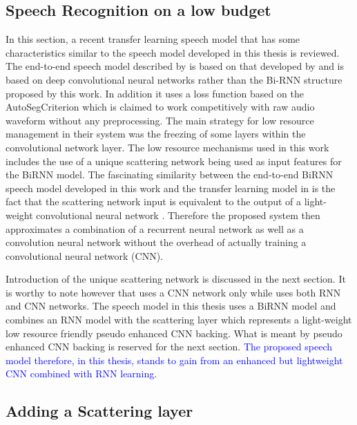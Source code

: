 \subsection{Speech Recognition on a low budget}

In this section, a recent transfer learning speech model \citep{kunze2017transfer} that has some characteristics similar to the speech model developed in this thesis is reviewed.  The end-to-end speech model described by \cite{kunze2017transfer} is based on that developed by \cite{collobert2016wav2letter} and is based on deep convolutional neural networks rather than the Bi-RNN structure proposed by this work.  In addition it uses a loss function based on the AutoSegCriterion which is claimed to work competitively with raw audio waveform without any preprocessing.  The main strategy for low resource management in their system was the freezing of some layers within the convolutional network layer.  The low resource mechanisms used in this work includes the use of a unique scattering network being used as input features for the BiRNN model.  The fascinating similarity between the end-to-end BiRNN speech model developed in this work and the transfer learning model in \cite{kunze2017transfer} is the fact that the scattering network input is equivalent to the output of a light-weight convolutional neural network \cite{mallat2016understanding}.  Therefore the proposed system then approximates a combination of a recurrent neural network as well as a convolution neural network without the overhead of actually training a convolutional neural network (CNN)\citep{szegedy2015going}.

Introduction of the unique scattering network is discussed in the next section.  It is worthy to note however that \cite{kunze2017transfer} uses a CNN network only while \cite{amodei2016deep} uses both RNN and CNN networks.  The speech model in this thesis uses a BiRNN model and combines an RNN model with the scattering layer which represents a light-weight low resource friendly pseudo enhanced CNN backing.  What is meant by pseudo enhanced CNN backing is reserved for the next section.  \textcolor{blue}{The proposed speech model therefore, in this thesis, stands to gain from an enhanced but lightweight CNN combined with RNN learning}.

\subsection{Adding a Scattering layer}\label{sec_2_3_3_scat}

